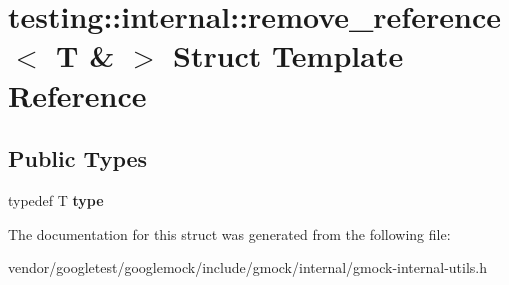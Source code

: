 \hypertarget{structtesting_1_1internal_1_1remove__reference_3_01_t_01_6_01_4}{}\section{testing\+:\+:internal\+:\+:remove\+\_\+reference$<$ T \& $>$ Struct Template Reference}
\label{structtesting_1_1internal_1_1remove__reference_3_01_t_01_6_01_4}
\subsection*{Public Types}
\begin{DoxyCompactItemize}
\item 
\mbox{\label{structtesting_1_1internal_1_1remove__reference_3_01_t_01_6_01_4_a0d72f004f54016a47c752a82be352a19}} 
typedef T {\bfseries type}
\end{DoxyCompactItemize}


The documentation for this struct was generated from the following file\+:\begin{DoxyCompactItemize}
\item 
vendor/googletest/googlemock/include/gmock/internal/gmock-\/internal-\/utils.\+h\end{DoxyCompactItemize}
